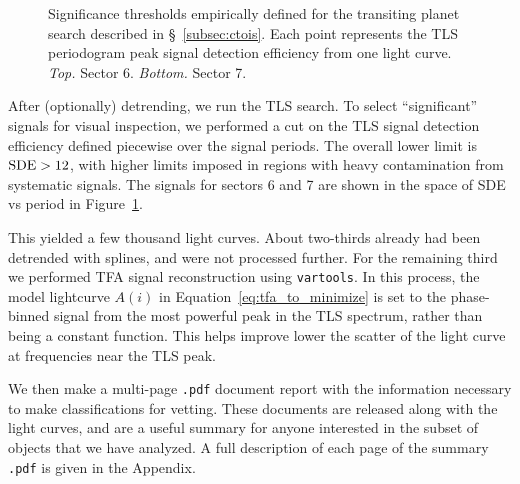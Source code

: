 \documentclass[12pt,twocolumn,tighten]{aastex62}
\begin{document}
\begin{figure}[!ht]
    \vspace{-0.8cm}
    \caption{
        Significance thresholds empirically defined for the transiting planet 
        search described in \S~\ref{subsec:ctois}. Each point represents the 
        TLS periodogram peak signal detection efficiency from one light curve.
        {\it Top.} Sector 6.  {\it Bottom.} Sector 7.
    }
    \label{fig:tlsresults}
\end{figure}

After (optionally) detrending, we run the TLS search. To select 
``significant'' signals for visual inspection, we 
performed a cut on the TLS signal detection efficiency defined piecewise over 
the signal periods.
The overall lower limit is ${\rm SDE} > 12$, with higher limits imposed in 
regions with heavy contamination from systematic signals.
The signals for sectors 6 and 7 are shown in the space of SDE vs period in 
Figure~\ref{fig:tlsresults}.

This yielded a few thousand light curves.  About two-thirds already had been 
detrended with splines, and were not processed further.
For the remaining third we
performed TFA signal reconstruction using 
\texttt{vartools}.
In this process, the model lightcurve $A(i)$ in 
Equation~\ref{eq:tfa_to_minimize} is set to the phase-binned signal from the 
most powerful peak in the TLS spectrum, rather than being a constant function. 
This helps improve lower the scatter of the light curve at frequencies near 
the TLS peak.

We then make a multi-page \texttt{.pdf} document report with the information 
necessary to make classifications for vetting.
These documents are released along with the light curves, and are a useful 
summary for anyone interested in the subset of objects that we have analyzed.
A full description of each page of the summary \texttt{.pdf} is given in the 
Appendix.
\end{document}
